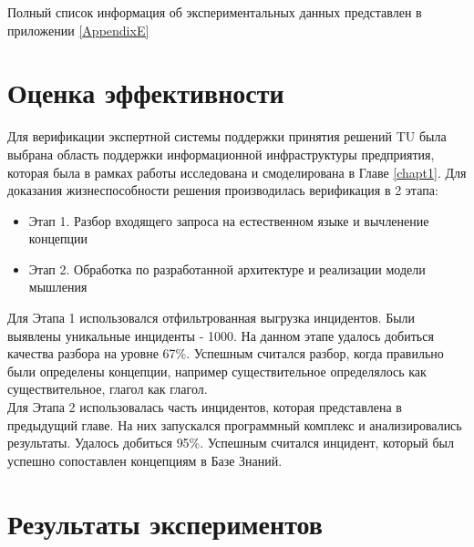 Полный список информация об экспериментальных данных представлен в приложении \ref{AppendixE}
\clearpage



\section{Оценка эффективности}
Для верификации экспертной системы поддержки принятия решений TU была выбрана область поддержки информационной инфраструктуры предприятия, которая была в рамках работы исследована и смоделирована в Главе \ref{chapt1}. 
Для доказания жизнеспособности решения производилась верификация в 2 этапа:
\begin{itemize}
	\item Этап 1. Разбор входящего запроса на естественном языке и вычленение концепции
	\item Этап 2. Обработка по разработанной архитектуре и реализации модели мышления  
\end{itemize}
Для Этапа 1 использовался отфильтрованная выгрузка инцидентов. Были выявлены уникальные инциденты - 1000. На данном этапе удалось добиться качества разбора на уровне 67\%. Успешным считался разбор, когда правильно были определены концепции, например существительное определялось как существительное, глагол как глагол. \\
Для Этапа 2 использовалась часть инцидентов, которая представлена в предыдущий главе. На них запускался программный комплекс и анализировались результаты. Удалось добиться 95\%. Успешным считался инцидент, который был успешно сопоставлен концепциям в Базе Знаний.\\




\section{Результаты экспериментов}

